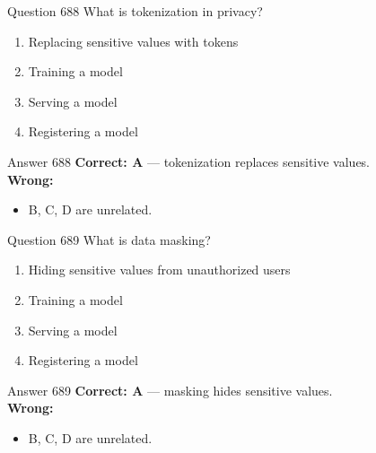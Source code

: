 \documentclass[aspectratio=169,11pt]{beamer}
\begin{document}
	\begin{frame}{Question 688}
		What is tokenization in privacy?
		\begin{enumerate}[label=\Alph*.]
			\item Replacing sensitive values with tokens
			\item Training a model
			\item Serving a model
			\item Registering a model
		\end{enumerate}
	\end{frame}
	\begin{frame}{Answer 688}
		\textbf{Correct: A} --- tokenization replaces sensitive values.\\
		\vspace{0.5em}
		\textbf{Wrong:}
		\begin{itemize}
			\item B, C, D are unrelated.
		\end{itemize}
	\end{frame}
	
	\begin{frame}{Question 689}
		What is data masking?
		\begin{enumerate}[label=\Alph*.]
			\item Hiding sensitive values from unauthorized users
			\item Training a model
			\item Serving a model
			\item Registering a model
		\end{enumerate}
	\end{frame}
	\begin{frame}{Answer 689}
		\textbf{Correct: A} --- masking hides sensitive values.\\
		\vspace{0.5em}
		\textbf{Wrong:}
		\begin{itemize}
			\item B, C, D are unrelated.
		\end{itemize}
	\end{frame}
	
\end{document}
